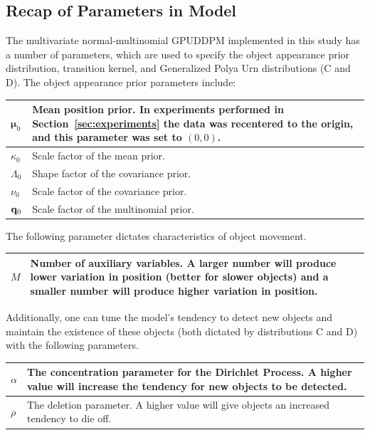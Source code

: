\documentclass[twocolumn, final]{svjour3}
\begin{document}
\subsection{Recap of Parameters in Model}
\label{sec:recapofparameters}

The multivariate normal-multinomial GPUDDPM implemented in this study has a number of parameters, which are used to specify the object appearance prior distribution, transition kernel, and Generalized Polya Urn distributions (C and D).\newpage %
\hspace{-5mm}The object appearance prior parameters include:
\begin{center}
\begin{tabular}[c]{| l |  p{7cm} | }
\hline
$\boldsymbol{\mu}_{0}$  &  Mean position prior. In experiments performed in Section~\ref{sec:experiments} the data was recentered to the origin, and this parameter was set to $(0,0)$. \\ \hline
$\kappa_{0}$  &  Scale factor of the mean prior.\\ \hline
$\Lambda_{0}$  &  Shape factor of the covariance prior.\\ \hline
$\nu_{0}$  &  Scale factor of the covariance prior.\\ \hline
$\bold{q}_{0}$  &  Scale factor of the multinomial prior. \\
\hline
\end{tabular}
\end{center} \vspace{3mm}
The following parameter dictates characteristics of object movement.
\begin{center}
\begin{tabular}[c]{ | l | p{7cm} | }
\hline
$M$  &  Number of auxiliary variables. A larger number will produce lower variation in position (better for slower objects) and a smaller number will produce higher variation in position. \\
\hline
\end{tabular}
\end{center} \vspace{3mm}
Additionally, one can tune the model's tendency to detect new objects and maintain the existence of these objects (both dictated by distributions C and D) with the following parameters.
\begin{center}
\begin{tabular}[c]{ | l | p{7cm} | }
\hline
$\alpha$  &  The concentration parameter for the Dirichlet Process. A higher value will increase the tendency for new objects to be detected.\\ \hline
$\rho$  &  The deletion parameter. A higher value will give objects an increased tendency to die off. \\
\hline
\end{tabular}
\end{center}
\end{document}
